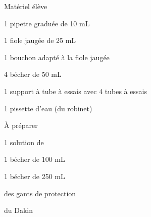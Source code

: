 
\vspace*{-12pt}
\begin{boiteMateriel}{Matériel élève}
  \effectifSeconde

  \begin{protocole}
    \item 1 pipette graduée de 10 mL
    \item 1 fiole jaugée de 25 mL
    \item 1 bouchon adapté à la fiole jaugée
    \item 4 bécher de 50 mL
    \item 1 support à tube à essais avec 4 tubes à essais
    \item 1 pissette d'eau (du robinet)
  \end{protocole}
\end{boiteMateriel}


\begin{boiteMateriel}{À préparer}
  \vspace*{4pt}
  \begin{protocole}[2]
    \item 1 solution de 
    \item 1 bécher de 100 mL
    \item 1 bécher de 250 mL
    \item des gants de protection
    \item du Dakin
  \end{protocole}
\end{boiteMateriel}
